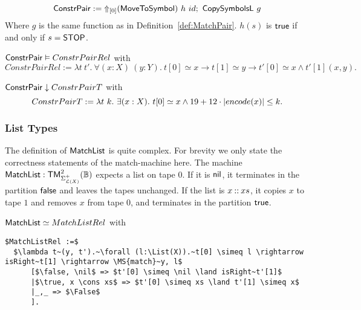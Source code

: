 \begin{definition}[$\MS{ConstrPair}$]
  \label{def:Constr_pair}
  ~
  \[
    \MS{ConstrPair} := \LiftTapes{(\MS{MoveToSymbol})}{\Vector{0}}~h~id \Seq \MS{CopySymbolsL}~g
  \]
  Where $g$ is the same function as in Definition~\ref{def:MatchPair}.  $h(s)$ is $\true$ if and only if $s=\MS{STOP}$.
\end{definition}

\begin{lemma}
  \label{lem:Constr_pair_Realise}
  \small
  $\MS{ConstrPair} \Realise ConstrPairRel$ with
  \[
    ConstrPairRel := \lambda t~t'.~\forall (x:X)~(y:Y).~t[0] \simeq x \rightarrow t[1] \simeq y \rightarrow t'[0] \simeq x \land t'[1] (x,y).
  \]
\end{lemma}
\begin{lemma}
  \label{lem:Constr_pair_TerminatesIn}
  $\MS{ConstrPair} \TerminatesIn ConstrPairT$ with
  \[
    ConstrPairT := \lambda t~k.~\exists (x: X).~t[0] \simeq x \land 19 + 12 \cdot \size{x} \leq k.
  \]
\end{lemma}

\subsubsection{List Types}
\label{sec:MatchList}

The definition of $\MS{MatchList}$ is quite complex.  For brevity we only state the correctness statements of the match-machine here.  The machine
$\MS{MatchList} : \TM_{\Sigma_{\List(X)}^+}^2(\Bool)$ expects a list on tape $0$.  If it is $\nil$, it terminates in the partition $\false$ and leaves
the tapes unchanged.  If the list is $x \cons xs$, it copies $x$ to tape $1$ and removes $x$ from tape $0$, and terminates in the partition $\true$.

\begin{lemma}
  \label{lem:MatchList_Realise}
  $\MS{MatchList} \simeq MatchListRel$ with
\begin{lstlisting}[style=semicoqstyle]
$MatchListRel :=$
  $\lambda t~(y, t').~\forall (l:\List(X)).~t[0] \simeq l \rightarrow isRight~t[1] \rightarrow \MS{match}~y, l$
      [$\false, \nil$ => $t'[0] \simeq \nil \land isRight~t'[1]$
      |$\true, x \cons xs$ => $t'[0] \simeq xs \land t'[1] \simeq x$
      |_,_ => $\False$
      ].
\end{lstlisting}
\end{lemma}

